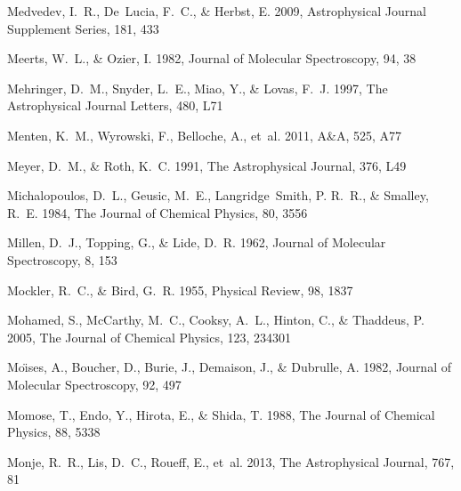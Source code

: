 \documentclass[twocolumn]{aastex631}
\begin{document}
\begin{thebibliography}{}
Medvedev, I.~R., De~Lucia, F.~C., \& Herbst, E. 2009, Astrophysical Journal
  Supplement Series, 181, 433

Meerts, W.~L., \& Ozier, I. 1982, Journal of Molecular Spectroscopy, 94, 38

Mehringer, D.~M., Snyder, L.~E., Miao, Y., \& Lovas, F.~J. 1997, The
  Astrophysical Journal Letters, 480, L71

Menten, K.~M., Wyrowski, F., Belloche, A., {et~al.} 2011, A{\&}A, 525, A77

Meyer, D.~M., \& Roth, K.~C. 1991, The Astrophysical Journal, 376, L49

Michalopoulos, D.~L., Geusic, M.~E., Langridge~Smith, P. R.~R., \& Smalley,
  R.~E. 1984, The Journal of Chemical Physics, 80, 3556

Millen, D.~J., Topping, G., \& Lide, D.~R. 1962, Journal of Molecular
  Spectroscopy, 8, 153

Mockler, R.~C., \& Bird, G.~R. 1955, Physical Review, 98, 1837

Mohamed, S., McCarthy, M.~C., Cooksy, A.~L., Hinton, C., \& Thaddeus, P. 2005,
  The Journal of Chemical Physics, 123, 234301

Mo{\"\i}ses, A., Boucher, D., Burie, J., Demaison, J., \& Dubrulle, A. 1982,
  Journal of Molecular Spectroscopy, 92, 497

Momose, T., Endo, Y., Hirota, E., \& Shida, T. 1988, The Journal of Chemical
  Physics, 88, 5338

Monje, R.~R., Lis, D.~C., Roueff, E., {et~al.} 2013, The Astrophysical Journal,
  767, 81


\end{thebibliography}
\end{document}
